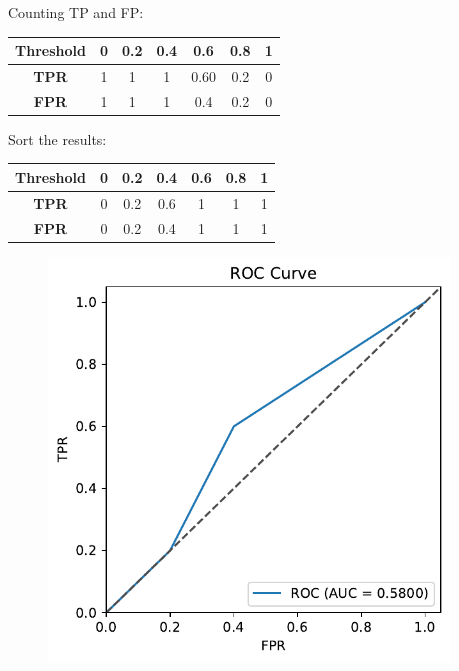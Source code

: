 \documentclass[aspectratio=169, 10pt]{beamer}
\begin{document}
\begin{frame}
\begin{columns}
\begin{column}{0.5\textwidth}
        \end{column}
        \begin{column}{0.5\textwidth}
            
            Counting TP and FP:

            \begin{table}[]
                \begin{tabular}{c|cccccc}
                \textbf{Threshold} & \textbf{0} & \textbf{0.2} & \textbf{0.4} & \textbf{0.6} & \textbf{0.8} & \textbf{1} \\ \hline
                \textbf{TPR}       & 1          & 1            & 1            & 0.60         & 0.2          & 0          \\
                \textbf{FPR}       & 1          & 1            & 1            & 0.4          & 0.2          & 0         
                \end{tabular}
            \end{table}
            
            Sort the results:

            \begin{table}[]
                \begin{tabular}{c|cccccc}
                \textbf{Threshold} & \textbf{0} & \textbf{0.2} & \textbf{0.4} & \textbf{0.6} & \textbf{0.8} & \textbf{1} \\ \hline
                \textbf{TPR}       & 0          & 0.2            & 0.6            & 1         & 1         & 1          \\
                \textbf{FPR}       & 0          & 0.2           & 0.4           & 1          & 1          & 1         
                \end{tabular}
            \end{table}

            \begin{figure}
                \centering
                \includegraphics[width=0.4\columnwidth]{../plots/roc_curve_eg.pdf}
            \end{figure}

        \end{column}
    \end{columns}
\end{frame}
\end{document}
